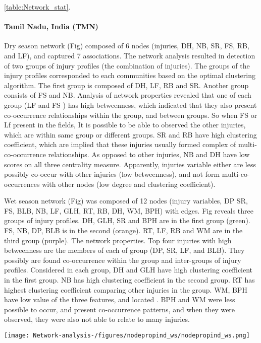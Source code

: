 \ref{table:Network_stat}.

\paragraph{Tamil Nadu, India (TMN)} 


Dry season network (Fig) composed of 6 nodes (injuries, DH, NB, SR, FS, RB, and LF), and captured 7 associations. The network analysis resulted in detection of two groups of injury profiles (the combination of injuries). The groups of the injury profiles corresponded to each communities based on the optimal clustering algorithm. The first group is composed of DH, LF, RB and SR.  Another group consists of FS and NB. Analysis of network properties revealed that one of each group (LF and FS ) has high betweenness, which indicated that they also present co-occurrence relationships within the group, and between groups. So when FS or Lf present in the fields, It is possible to be able to observed the other injuries, which are within same group or different groups. SR and RB have high clustering coefficient, which are implied that these injuries usually formed complex of multi-co-occurrence relationships. As opposed to other injuries, NB and DH have low scores on all three centrality measure. Apparently, injuries variable either are less possibly co-occur with other injuries (low betweenness), and not form multi-co-occurrences with other nodes (low degree and clustering coefficient).


Wet season network (Fig) was composed of 12 nodes (injury variables, DP SR, FS, BLB, NB, LF, GLH, RT, RB, DH, WM, BPH) with edges. Fig reveals three groups of injury profiles. 
DH, GLH, SR and BPH are in the first group (green). FS, NB, DP, BLB is in the second (orange). RT, LF, RB and WM are in the third group (purple). The network properties. Top four injuries with high betweenness are the members of each of group (DP, SR, LF, and BLB). They possibly are found co-occurrence within the group and inter-groups of injury profiles. Considered in each group, DH and GLH have high clustering coefficient in the first group. NB has high clustering coefficient in the second group. RT has highest clustering coefficient comparing other injuries in the group. WM, BPH have low value of the three features, and located . BPH and WM were less possible to occur, and present co-occurrence patterns, and when they were observed, they were also not able to relate to many injuries. 
  

\texttt{[image: Network-analysis-/figures/nodepropind\_ws/nodepropind\_ws.png]}


